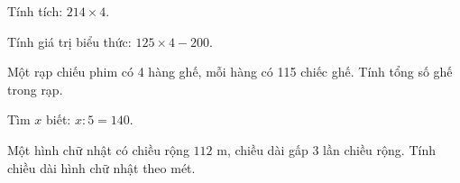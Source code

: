 \begin{ex} %
Tính tích: $214 \times 4$.
\end{ex}

\begin{ex} %
Tính giá trị biểu thức: $125 \times 4 - 200$.
\end{ex}

\begin{ex} %
Một rạp chiếu phim có 4 hàng ghế, mỗi hàng có 115 chiếc ghế. Tính tổng số ghế trong rạp.
\end{ex}

\begin{ex} %
Tìm $x$ biết: $x : 5 = 140$.
\end{ex}

\begin{ex} %
Một hình chữ nhật có chiều rộng $112\text{ m}$, chiều dài gấp 3 lần chiều rộng. Tính chiều dài hình chữ nhật theo mét.
\end{ex}
